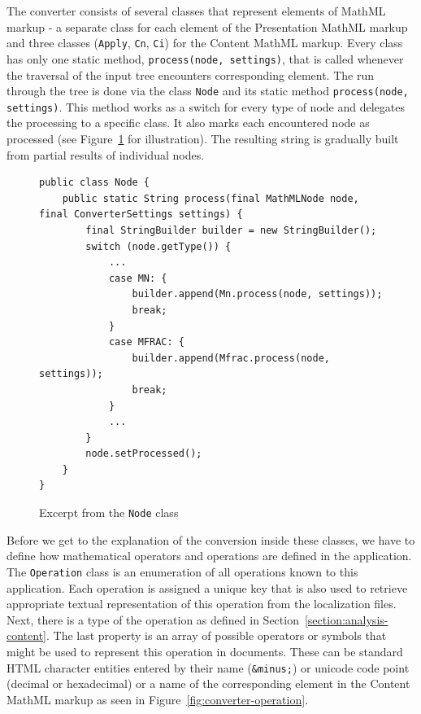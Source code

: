 \documentclass[11pt,oneside,final]{fithesis2}
\begin{document}
The converter consists of several classes that represent elements of MathML markup - a separate class for each element of the Presentation MathML markup and three classes (\texttt{Apply}, \texttt{Cn}, \texttt{Ci}) for the Content MathML markup. Every class has only one static method, \texttt{process(node, settings)}, that is called whenever the traversal of the input tree encounters corresponding element. The run through the tree is done via the class \texttt{Node} and its static method \texttt{process(node, settings)}. This method works as a switch for every type of node and delegates the processing to a specific class. It also marks each encountered node as processed (see Figure~\ref{fig:converter-node} for illustration). The resulting string is gradually built from partial results of individual nodes.

\begin{figure}[!ht]
\begin{lstlisting}
public class Node {
	public static String process(final MathMLNode node, final ConverterSettings settings) {
		final StringBuilder builder = new StringBuilder();
        switch (node.getType()) {
            ...
            case MN: {
                builder.append(Mn.process(node, settings));
                break;
            }
            case MFRAC: {    
                builder.append(Mfrac.process(node, settings));
                break;
            }
            ...
        }
        node.setProcessed();
    }    
}
\end{lstlisting}
\caption{Excerpt from the \texttt{Node} class}
\label{fig:converter-node}
\end{figure}

Before we get to the explanation of the conversion inside these classes, we have to define how mathematical operators and operations are defined in the application. The \texttt{Operation} class is an enumeration of all operations known to this application. Each operation is assigned a unique key that is also used to retrieve appropriate textual representation of this operation from the localization files. Next, there is a type of the operation as defined in Section~\ref{section:analysis-content}. The last property is an array of possible operators or symbols that might be used to represent this operation in documents. These can be standard HTML character entities entered by their name (\texttt{\&minus;}) or unicode code point (decimal or hexadecimal) or a name of the corresponding element in the Content MathML markup as seen in Figure~\ref{fig:converter-operation}.
\end{document}
